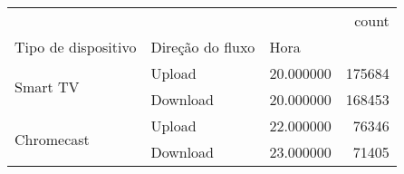 \begin{tabular}{lllr}
\toprule
 &  &  & count \\
Tipo de dispositivo & Direção do fluxo & Hora &  \\
\midrule
\multirow[t]{2}{*}{Smart TV} & Upload & 20.000000 & 175684 \\
\cline{2-4}
 & Download & 20.000000 & 168453 \\
\cline{1-4} \cline{2-4}
\multirow[t]{2}{*}{Chromecast} & Upload & 22.000000 & 76346 \\
\cline{2-4}
 & Download & 23.000000 & 71405 \\
\cline{1-4} \cline{2-4}
\bottomrule
\end{tabular}

